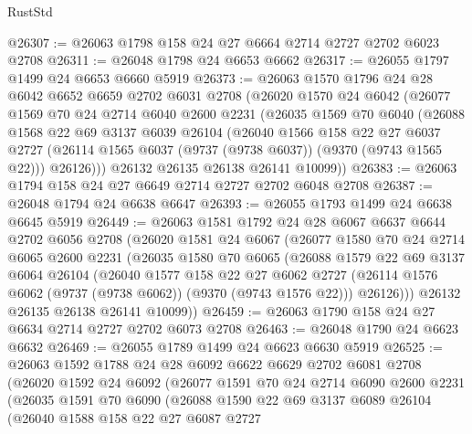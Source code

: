 \begin{lexlean}{RustStd}
\begin{coremodule}
{\begin{coremodule}
{{{{{{{{{{{{{{{{{{{{{{{{{{{{{{{{{{{{{{{@26307 := @26063 @1798 @158 @24 @27 @6664 @2714 @2727 @2702 @6023 @2708
@26311 := @26048 @1798 @24 @6653 @6662
@26317 := @26055 @1797 @1499 @24 @6653 @6660 @5919
@26373 := @26063
    @1570
    @1796
    @24
    @28
    @6042
    @6652
    @6659
    @2702
    @6031
    @2708
    (@26020
      @1570
      @24
      @6042
      (@26077
        @1569
        @70
        @24
        @2714
        @6040
        @2600
        @2231
        (@26035
          @1569
          @70
          @6040
          (@26088
            @1568
            @22
            @69
            @3137
            @6039
            @26104
            (@26040
              @1566
              @158
              @22
              @27
              @6037
              @2727
              (@26114 @1565 @6037 (@9737 (@9738 @6037)) (@9370 (@9743 @1565 @22)))
              @26126)))
        @26132
        @26135
        @26138
        @26141
        @10099))
@26383 := @26063 @1794 @158 @24 @27 @6649 @2714 @2727 @2702 @6048 @2708
@26387 := @26048 @1794 @24 @6638 @6647
@26393 := @26055 @1793 @1499 @24 @6638 @6645 @5919
@26449 := @26063
    @1581
    @1792
    @24
    @28
    @6067
    @6637
    @6644
    @2702
    @6056
    @2708
    (@26020
      @1581
      @24
      @6067
      (@26077
        @1580
        @70
        @24
        @2714
        @6065
        @2600
        @2231
        (@26035
          @1580
          @70
          @6065
          (@26088
            @1579
            @22
            @69
            @3137
            @6064
            @26104
            (@26040
              @1577
              @158
              @22
              @27
              @6062
              @2727
              (@26114 @1576 @6062 (@9737 (@9738 @6062)) (@9370 (@9743 @1576 @22)))
              @26126)))
        @26132
        @26135
        @26138
        @26141
        @10099))
@26459 := @26063 @1790 @158 @24 @27 @6634 @2714 @2727 @2702 @6073 @2708
@26463 := @26048 @1790 @24 @6623 @6632
@26469 := @26055 @1789 @1499 @24 @6623 @6630 @5919
@26525 := @26063
    @1592
    @1788
    @24
    @28
    @6092
    @6622
    @6629
    @2702
    @6081
    @2708
    (@26020
      @1592
      @24
      @6092
      (@26077
        @1591
        @70
        @24
        @2714
        @6090
        @2600
        @2231
        (@26035
          @1591
          @70
          @6090
          (@26088
            @1590
            @22
            @69
            @3137
            @6089
            @26104
            (@26040
              @1588
              @158
              @22
              @27
              @6087
              @2727
}}}}}}}}}}}}}}}}}}}}}}}}}}}}}}}}}}}}}}}
\end{coremodule}}
\end{coremodule}
\end{lexlean}
